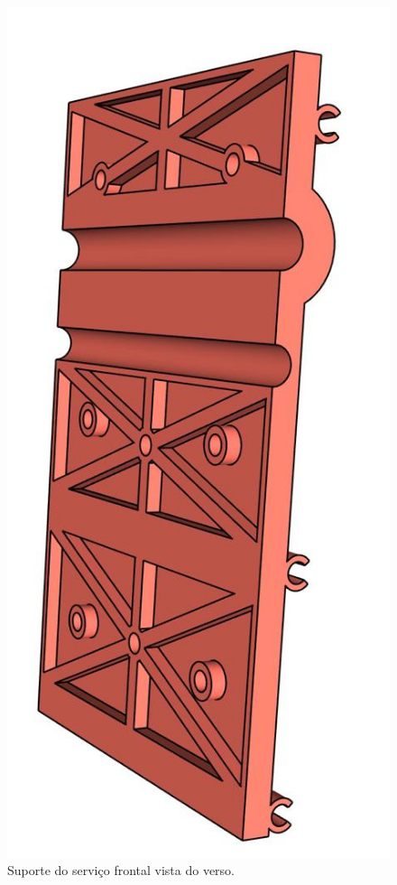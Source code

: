\begin{figure}[H]
\centering
\caption{Suporte do serviço frontal vista do verso.}\label{fig:ressuporteservicofrontalfv}
\includegraphics[scale = 0.4]{figuras/ressuporteservicofrontalfv}
\end{figure}
        
